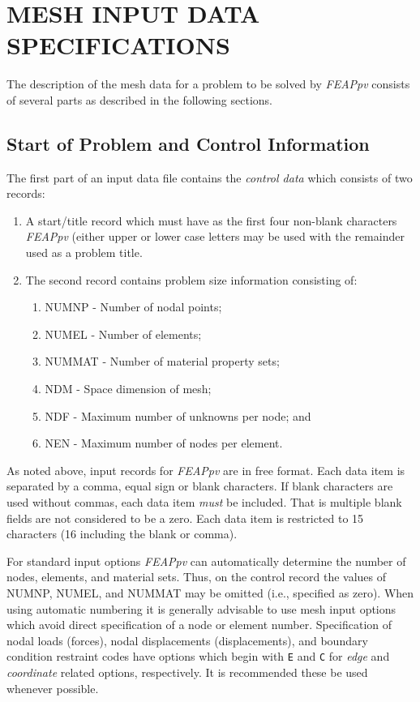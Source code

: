 \chapter[Mesh Input Data]{MESH INPUT DATA SPECIFICATIONS}
\label{meshin}

The description of the mesh data for a problem to be solved by {\sl FEAPpv}
consists of several parts as described in the following sections.

\section{Start of Problem and Control Information}
\label{start}

The first part of an input data file contains the {\it control data}
which consists of two records:
\begin{enumerate}
\item
A start/title record which must have as the
first four non-blank characters {\sl FEAPpv} (either upper or lower case letters
may be used with the remainder used as a problem title.
\item
The second record contains
problem size information consisting of:
\begin{enumerate}
\item NUMNP - Number of nodal points;
\item NUMEL - Number of elements;
\item NUMMAT - Number of material property sets;
\item NDM - Space dimension of mesh;
\item NDF - Maximum number of unknowns per node; and
\item NEN - Maximum number of nodes per element.
\end{enumerate}
\end{enumerate}
As noted above,
input records for {\sl FEAPpv} are in free format.  Each data item
is separated by a comma, equal sign or blank characters.
If blank characters are used without commas, each data item {\it must} be
included.  That is multiple blank fields are not considered to be a zero.
Each data item is restricted to 15 characters (16 including the blank or
comma).

For standard input options
{\sl FEAPpv} can automatically determine the number of nodes,
elements, and material sets.  Thus, on the control record the values of NUMNP,
NUMEL, and NUMMAT may be omitted (i.e., specified as zero).  When using
automatic numbering it is generally advisable to use mesh input options
which avoid direct specification of a node or element number.  Specification
of nodal loads (forces), nodal displacements (displacements), and boundary
condition restraint codes have options which begin with {\tt E} and {\tt C}
for {\it edge} and {\it coordinate} related options, respectively.
It is recommended these be used whenever possible.

